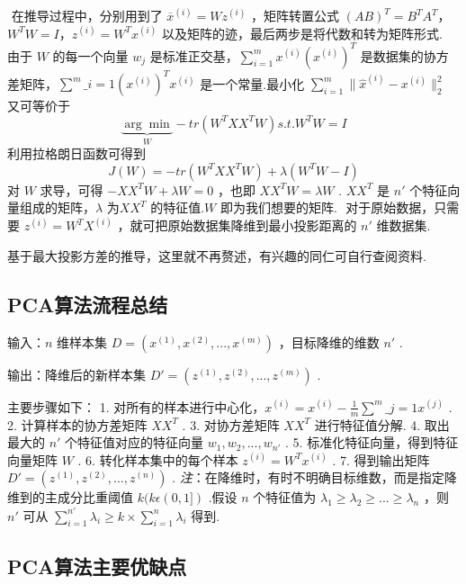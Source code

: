​ 在推导过程中，分别用到了 $\overline{x}^{(i)} = Wz^{(i)}$
，矩阵转置公式
$(AB)^T = B^TA^T$，$W^TW = I$，$z^{(i)} = W^Tx^{(i)}$
以及矩阵的迹，最后两步是将代数和转为矩阵形式. ​ 由于 $W$ 的每一个向量
$w_j$ 是标准正交基，$\sum^m_{i=1} x^{(i)} \left( x^{(i)} \right)^T$
是数据集的协方差矩阵，$\sum^m\_{i=1} \left( x^{(i)}
\right)^T x^{(i)} $ 是一个常量.最小化
$\sum^m_{i=1} \| \hat{x}^{(i)} - x^{(i)} \|^2_2$ 又可等价于 \[
\underbrace{\arg \min}_W - tr \left( W^TXX^TW \right) s.t.W^TW = I
\] 利用拉格朗日函数可得到 \[
J(W) = -tr(W^TXX^TW) + \lambda(W^TW - I)
\] ​ 对 $W$ 求导，可得 $-XX^TW + \lambda W = 0 $ ，也即 $
XX^TW = \lambda W $ . $ XX^T $ 是 $ n' $
个特征向量组成的矩阵，$\lambda$ 为$ XX^T $ 的特征值.$W$
即为我们想要的矩阵. ​ 对于原始数据，只需要 $z^{(i)} = W^TX^{(i)}$
，就可把原始数据集降维到最小投影距离的 $n'$ 维数据集.

​ 基于最大投影方差的推导，这里就不再赘述，有兴趣的同仁可自行查阅资料.

\subsection{PCA算法流程总结}\label{pcaux7b97ux6cd5ux6d41ux7a0bux603bux7ed3}

输入：$n​$ 维样本集
$D = \left( x^{(1)},x^{(2)},...,x^{(m)} \right)​$ ，目标降维的维数
$n'​$ .

输出：降维后的新样本集
$D' = \left( z^{(1)},z^{(2)},...,z^{(m)} \right)$ .

主要步骤如下： 1. 对所有的样本进行中心化，$ x^{(i)} = x^{(i)}
- \frac{1}{m} \sum^m\_{j=1} x^{(j)} $ . 2.
计算样本的协方差矩阵 $XX^T​$ . 3. 对协方差矩阵 $XX^T$
进行特征值分解. 4. 取出最大的 $n' $ 个特征值对应的特征向量
${ w_1,w_2,...,w_{n'} }$ . 5. 标准化特征向量，得到特征向量矩阵
$W$ . 6. 转化样本集中的每个样本 $z^{(i)} = W^T x^{(i)}$ . 7.
得到输出矩阵 $D' = \left( z^{(1)},z^{(2)},...,z^{(n)} \right)​$ .
\emph{注}：在降维时，有时不明确目标维数，而是指定降维到的主成分比重阈值
$k(k \epsilon(0,1])​$ .假设 $n​$ 个特征值为
$\lambda_1 \geqslant \lambda_2 \geqslant ... \geqslant \lambda_n​$
，则 $n'​$ 可从
$\sum^{n'}_{i=1} \lambda_i \geqslant k \times \sum^n_{i=1} \lambda_i ​$
得到.

\subsection{PCA算法主要优缺点}\label{pcaux7b97ux6cd5ux4e3bux8981ux4f18ux7f3aux70b9}

